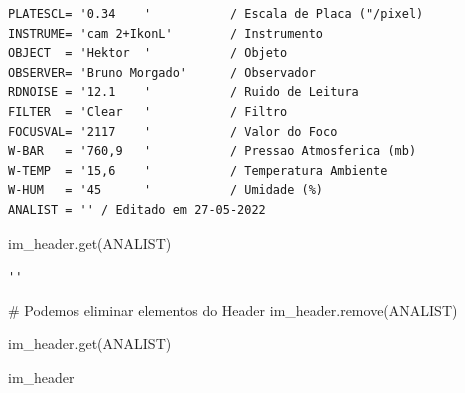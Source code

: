 \documentclass[
  letterpaper,
  DIV=11,
  numbers=noendperiod]{scrreprt}
\newenvironment{Shaded}{\begin{snugshade}}{\end{snugshade}}
\newcommand{\CommentTok}[1]{\textcolor[rgb]{0.37,0.37,0.37}{#1}}
\newcommand{\NormalTok}[1]{\textcolor[rgb]{0.00,0.23,0.31}{#1}}
\newcommand{\StringTok}[1]{\textcolor[rgb]{0.13,0.47,0.30}{#1}}
\begin{document}
\begin{verbatim}
PLATESCL= '0.34    '           / Escala de Placa ("/pixel)                      
INSTRUME= 'cam 2+IkonL'        / Instrumento                                    
OBJECT  = 'Hektor  '           / Objeto                                         
OBSERVER= 'Bruno Morgado'      / Observador                                     
RDNOISE = '12.1    '           / Ruido de Leitura                               
FILTER  = 'Clear   '           / Filtro                                         
FOCUSVAL= '2117    '           / Valor do Foco                                  
W-BAR   = '760,9   '           / Pressao Atmosferica (mb)                       
W-TEMP  = '15,6    '           / Temperatura Ambiente                           
W-HUM   = '45      '           / Umidade (%)                                    
ANALIST = '' / Editado em 27-05-2022                                            
\end{verbatim}

\begin{Shaded}
\begin{Highlighting}[]
\NormalTok{im\_header.get(}\StringTok{\textquotesingle{}ANALIST\textquotesingle{}}\NormalTok{)}
\end{Highlighting}
\end{Shaded}

\begin{verbatim}
''
\end{verbatim}

\begin{Shaded}
\begin{Highlighting}[]
\CommentTok{\# Podemos eliminar elementos do Header}
\NormalTok{im\_header.remove(}\StringTok{\textquotesingle{}ANALIST\textquotesingle{}}\NormalTok{)}
\end{Highlighting}
\end{Shaded}

\begin{Shaded}
\begin{Highlighting}[]
\NormalTok{im\_header.get(}\StringTok{\textquotesingle{}ANALIST\textquotesingle{}}\NormalTok{)}
\end{Highlighting}
\end{Shaded}

\begin{Shaded}
\begin{Highlighting}[]
\NormalTok{im\_header}
\end{Highlighting}
\end{Shaded}
\end{document}
